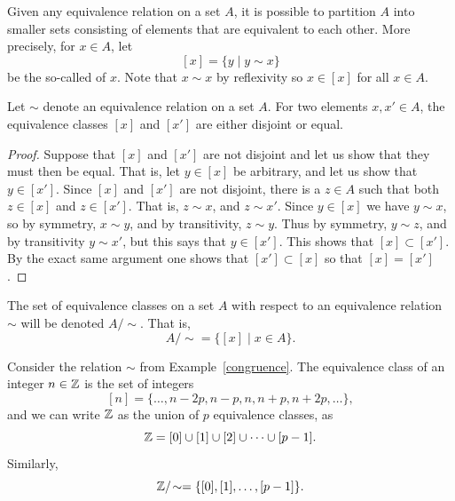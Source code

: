 Given any equivalence relation on a set $A$, it is possible to partition $A$ into smaller sets consisting of elements that are equivalent to each other. More precisely, for $x \in A$, let
\[
  [x] = \{ y \mid y \sim x \}
\]
be the so-called  of $x$. Note that $x \sim x$ by reflexivity so $x \in [x]$ for all $x \in A$.
\begin{lem}
  Let $\sim$ denote an equivalence relation on a set $A$. For two elements $x, x' \in A$, the equivalence classes $[x]$ and $[x']$ are either disjoint or equal.
\end{lem}
\begin{proof}
  Suppose that $[x]$ and $[x']$ are not disjoint and let us show that they must then be equal. That is, let $y \in [x]$ be arbitrary, and let us show that $y \in [x']$. Since $[x]$ and $[x']$ are not disjoint, there is a $z \in A$ such that both $z \in [x]$ and $z \in [x']$. That is, $z \sim x$, and $z \sim x'$. Since $y \in [x]$ we have $y \sim x$, so by symmetry, $x \sim y$, and by transitivity, $z \sim y$. Thus by symmetry, $y \sim z$, and by transitivity $y \sim x'$, but this says that $y \in [x']$. This shows that $[x] \subset [x']$. By the exact same argument one shows that $[x'] \subset [x]$ so that $[x] = [x']$.
\end{proof}
The set of equivalence classes on a set $A$ with respect to an equivalence relation $\sim$ will be denoted $A/\!\sim$. That is,
\[
  A/\!\sim = \{ [x] \mid x \in A \}.
\]
\begin{example}
  Consider the relation $\sim$ from Example~\ref{congruence}. The equivalence class of an integer $n \in \mathbb{Z}$ is the set of integers
  \[
    [n] = \{\dots, n-2p, n-p, n, n+p, n+2p, \dots \},
  \]
  and we can write $\mathbb{Z}$ as the union of $p$ equivalence classes, as
  \[
    \mathbb{Z} = [0] \cup [1] \cup [2] \cup \dots \cup [p-1].
  \]
  Similarly,
  \[
    \mathbb{Z}/\!\sim = \{[0], [1], \dots, [p-1]\}.
  \]
\end{example}

